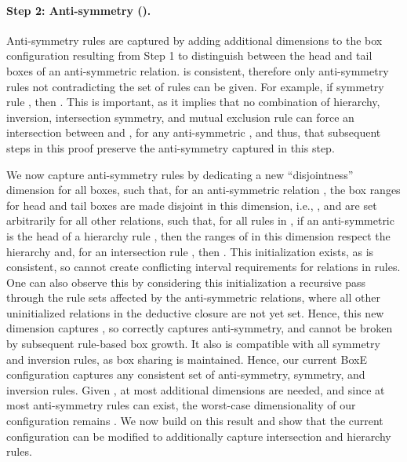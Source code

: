 \documentclass{article}
\begin{document}
\paragraph{Step 2: Anti-symmetry ().} Anti-symmetry rules are captured by adding additional dimensions to the box configuration resulting from Step 1 to distinguish between the head and tail boxes of an anti-symmetric relation.  is consistent, therefore only anti-symmetry rules not contradicting the set of rules  can be given. For example, if symmetry rule , then . This is important, as it implies that no combination of hierarchy, inversion, intersection symmetry, and mutual exclusion rule can force an intersection between  and , for any anti-symmetric , and thus, that subsequent steps in this proof preserve the anti-symmetry captured in this step.  


We now capture anti-symmetry rules by dedicating a new ``disjointness'' dimension for all boxes, such that, for an anti-symmetric relation , the box ranges for head and tail boxes are made disjoint in this dimension, i.e., , and are set arbitrarily for all other relations, such that, for all rules in , if an anti-symmetric  is the head of a hierarchy rule , then the ranges of  in this dimension respect the hierarchy and, for an intersection rule , then . This initialization exists, as  is consistent, so cannot create conflicting interval requirements for relations in rules. One can also observe this by considering this initialization a recursive pass through the rule sets affected by the anti-symmetric relations, where all other uninitialized relations in the deductive closure are not yet set. Hence, this new dimension captures , so correctly captures anti-symmetry, and cannot be broken by subsequent rule-based box growth. It also is compatible with all symmetry and inversion rules, as box sharing is maintained. Hence, our current BoxE configuration captures any consistent set of anti-symmetry, symmetry, and inversion rules. Given , at most  additional dimensions are needed, and since at most  anti-symmetry rules can exist, the worst-case dimensionality of our configuration remains .
We now build on this result and show that the current configuration can be modified to additionally capture intersection and hierarchy rules.
\end{document}
